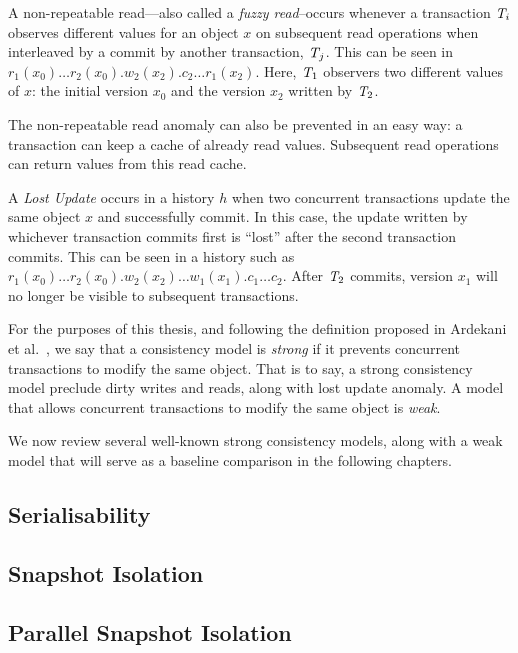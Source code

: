 \begin{definition}
A non-repeatable read---also called a \emph{fuzzy read}--occurs whenever a transaction $\mathit{T}_i$ observes different values for an object $x$ on subsequent read operations when interleaved by a commit by another transaction, $\mathit{T}_j$. This can be seen in $r_1(x_0)\ldots r_2(x_0).w_2(x_2).c_2 \ldots r_1(x_2)$. Here, $\mathit{T}_1$ observers two different values of $x$: the initial version $x_0$ and the version $x_2$ written by $\mathit{T}_2$.
\end{definition}

The non-repeatable read anomaly can also be prevented in an easy way: a transaction can keep a cache of already read values. Subsequent read operations can return values from this read cache.

\begin{definition}
A \emph{Lost Update} occurs in a history $h$ when two concurrent transactions update the same object $x$ and successfully commit. In this case, the update written by whichever transaction commits first is ``lost'' after the second transaction commits. This can be seen in a history such as $r_1(x_0)\ldots r_2(x_0).w_2(x_2) \ldots w_1(x_1).c_1\ldots c_2$. After $\mathit{T}_2$ commits, version $x_1$ will no longer be visible to subsequent transactions.
\end{definition}

For the purposes of this thesis, and following the definition proposed in Ardekani et al.~\citep{ardekani_thesis}, we say that a consistency model is \emph{strong} if it prevents concurrent transactions to modify the same object. That is to say, a strong consistency model preclude dirty writes and reads, along with lost update anomaly. A model that allows concurrent transactions to modify the same object is \emph{weak}.

We now review several well-known strong consistency models, along with a weak model that will serve as a baseline comparison in the following chapters.

\subsection{Serialisability}
\subsection{Snapshot Isolation}
\subsection{Parallel Snapshot Isolation}
